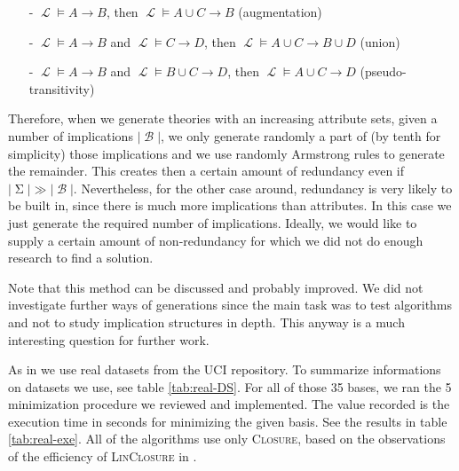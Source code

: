 \documentclass[runningheads]{llncs}
\DeclareMathOperator{\I}{\mathcal{L}}  %
\DeclareMathOperator{\Sg}{\Sigma}  %
\DeclareMathOperator{\imp}{\longrightarrow} %
\DeclareMathOperator{\B}{\mathcal{B}}
\begin{document}
\begin{itemize}
	\item[-] $\I \models A \imp B$, then $\I \models A \cup C \imp B$ (augmentation)
	\item[-] $\I \models A \imp B$ and $ \I \models C \imp D$, then $\I \models A \cup C \imp B \cup D$ (union)
	\item[-] $\I \models A \imp B$ and $ \I \models B \cup C \imp D$, then 
	$\I \models A \cup C \imp D$ (pseudo-transitivity)
\end{itemize}
\noindent Therefore, when we generate theories with an increasing attribute sets, given a number of implications $|\B|$, we only generate randomly a part of (by tenth for simplicity) those implications and we use randomly Armstrong rules to generate the remainder. This creates then a certain amount of redundancy even if $|\Sg| \gg |\B|$. Nevertheless, for the other case around, redundancy is very likely to be built in, since there is much more implications than attributes. In this case we just generate the required number of implications. Ideally, we would like to supply a certain amount of non-redundancy for which we did not do enough research to find a solution. 

Note that this method can be discussed and probably improved. We did not investigate further ways of generations since the main task was to test algorithms and not to study implication structures in depth. This anyway is a much interesting question for further work.

As in \cite{bazhanov_optimizations_2014} we use real datasets from the UCI repository. To summarize informations on datasets we use, see table \ref{tab:real-DS}. For all of those 35 bases, we ran the 5 minimization procedure we reviewed and implemented. The value recorded is the execution time in seconds for minimizing the given basis. See the results in table \ref{tab:real-exe}. All of the algorithms use only \textsc{Closure}, based on the observations of the efficiency of \textsc{LinClosure} in \cite{bazhanov_optimizations_2014}.
\end{document}
